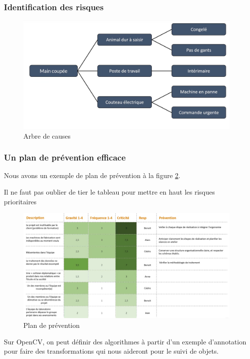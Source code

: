 \subsubsection{Identification des risques}
\begin{figure}[!h]
	\begin{center}
		\includegraphics[scale=0.25]{images/arbre_causes.png}
		\caption{Arbre de causes}
		\label{fig:arbre_causes}
	\end{center}
\end{figure}
\subsubsection{Un plan de prévention efficace}
Nous avons un exemple de plan de prévention à la figure \ref{fig:plan_prevention}.
\begin{danger}
	Il ne faut pas oublier de tier le tableau pour mettre en haut les risques prioritaires
\end{danger}
\begin{figure}[!h]
	\begin{center}
		\includegraphics[scale=0.25]{images/plan_prevention.png}
		\caption{Plan de prévention}
		\label{fig:plan_prevention}
	\end{center}
\end{figure}
Sur OpenCV, on peut définir des algorithmes à partir d'un exemple d'annotation pour faire des transformations qui nous aideront pour le suivi de objets.
\clearpage
